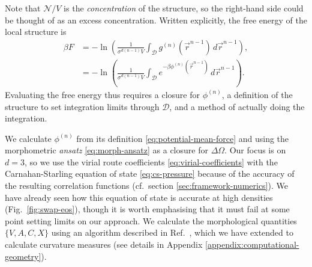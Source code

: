 \documentclass[11pt,twoside]{report}
\begin{document}
Note that $\mathcal{N} / V$ is the \emph{concentration} of the structure, so the right-hand side could be thought of as an excess concentration.
Written explicitly, the free energy of the local structure is
\begin{equation}\label{eq:local-structure-free-energy}
  \begin{split}
    \beta F
    &=
    -\ln{
      \left(
        \frac{1}{\sigma^{d(n-1)} V}
        \int_{\mathcal{D}}
        g^{(n)}(\vec{r}^{n-1}) \, d\vec{r}^{n-1}
      \right)
    },
    \\
    &=
    -\ln{
      \left(
        \frac{1}{\sigma^{d(n-1)} V}
        \int_{\mathcal{D}}
        e^{-\beta\phi^{(n)}(\vec{r}^{n-1})} \, d\vec{r}^{n-1}
      \right)
    }.
  \end{split}
\end{equation}
Evaluating the free energy thus requires a closure for $\phi^{(n)}$, a definition of the structure to set integration limits through $\mathcal{D}$, and a method of actually doing the integration.

We calculate $\phi^{(n)}$ from its definition \eqref{eq:potential-mean-force} and using the morphometric \emph{ansatz} \eqref{eq:morph-ansatz} as a closure for $\Delta \Omega$.
Our focus is on $d=3$, so we use the virial route coefficients \eqref{eq:virial-coefficients} with the Carnahan-Starling equation of state \eqref{eq:cs-pressure} because of the accuracy of the resulting correlation functions (cf.\ section \ref{sec:framework-numerics}).
We have already seen how this equation of state is accurate at high densities (Fig.\ \ref{fig:swap-eos}), though it is worth emphasising that it must fail at some point setting limits on our approach.
We calculate the morphological quantities $\{V, A, C, X\}$ using an algorithm described in Ref.\ \cite{KleninJCC2011}, which we have extended to calculate curvature measures (see details in Appendix \ref{appendix:computational-geometry}).
\end{document}
